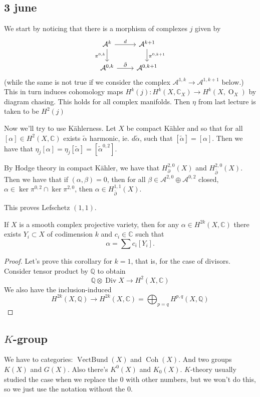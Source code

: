 \documentclass{article}
\newcommand{\C}{\mathbb{C}}
\newcommand{\Q}{\mathbb{Q}}
\newcommand{\Ac}{\mathcal{A}}
\DeclareMathOperator{\VectBund}{VectBund}
\DeclareMathOperator{\Coh}{Coh}
\DeclareMathOperator{\Div}{Div}
\renewcommand{\O}{\operatorname{O}}
\begin{document}
\subsection{3 june}
We start by noticing that there is a morphism of complexes $j$ given by
\[\begin{tikzcd}
	\Ac^{k}\arrow[r,"d"]\arrow[d,"\pi^{0,k}",swap]&\Ac^{k+1}\arrow[d,"\pi^{0,k+1}"]\\
	\Ac^{0,k}\arrow[r,"\bar\partial"]&\Ac^{0,k+1}
\end{tikzcd}\]
(while the same is not true if we consider the complex $\Ac^{1,k}\to\Ac^{1,k+1}$ below.) This in turn induces cohomology maps $H^k(j):H^k(X,\C_X)\to H^k(X,\O_X)$ by diagram chasing. This holds for all complex manifolds. Then $\eta$ from last lecture is taken to be $H^2(j)$

Now we'll try to use Kählerness. Let $X$ be compact Kähler and so that for all $[\alpha]\in H^2(X,\C)$ exists $\tilde\alpha$ harmonic, ie. $d\tilde\alpha$, such that $[\tilde\alpha]=[\alpha]$. Then we have that $\eta_j[\alpha]=\eta_j[\tilde\alpha]=[\tilde\alpha^{0,2}]$.

By Hodge theory in compact Kähler, we have that $H_\partial^{2,0}(X)$ and $H^{2,0}_{\bar\partial}(X)$. Then we have that if $(\alpha,\beta)=0$, then for all $\beta\in\Ac^{2,0}\oplus\Ac^{0,2}$ closed, $\alpha\in\ker\pi^{0,2}\cap\ker\pi^{2,0}$, then $\alpha\in H^{1,1}_{\bar\partial}(X)$.

This proves Lefschetz $(1,1)$.

\begin{coro}
	If $X$ is a smooth complex projective variety, then for any $\alpha\in H^{2k}(X,\C)$ there exists $Y_i\subset X$ of codimension $k$ and $c_i\in\C$ such that
	\[\alpha=\sum c_i[Y_i].\]
\end{coro}
\begin{proof}
	Let's prove this corollary for $k=1$, that is, for the case of divisors. Consider tensor product by $\Q$ to obtain
	\[\Q\otimes\Div X\to H^2(X,\C)\]
	We also have the inclusion-induced
	\[H^{2k}(X,\Q)\to H^{2k}(X,\C)=\bigoplus_{p=q}H^{p,q}(X,\Q)\]
\end{proof}
\subsection{$K$-group}
We have to categories: $\VectBund(X)$ and $\Coh(X)$. And two groups $K(X)$ and $G(X)$. Also there's $K^0(X)$ and $K_0(X)$. $K$-theory usually studied the case when we replace the $0$ with other numbers, but we won't do this, so we just use the notation without the $0$.
\end{document}
